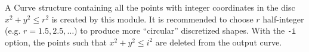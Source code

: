 A Curve structure containing all the points with integer coordinates in
the disc $x^2+y^2 \leq r^2$ is created by this module.
It is recommended to choose $r$ half-integer 
(e.g. $r=1.5, 2.5, \ldots$) to produce more ``circular'' discretized shapes.
With the \verb+-i+ option, the points such that
$x^2+y^2 \leq i^2$ are deleted from the output curve.